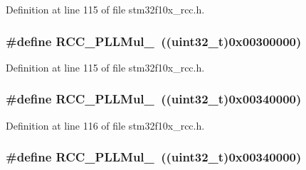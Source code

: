 Definition at line 115 of file stm32f10x\+\_\+rcc.\+h.

\subsubsection[{\texorpdfstring{R\+C\+C\+\_\+\+P\+L\+L\+Mul\+\_\+14}{RCC_PLLMul_14}}]{\setlength{\rightskip}{0pt plus 5cm}\#define R\+C\+C\+\_\+\+P\+L\+L\+Mul\+\_~(({\bf uint32\+\_\+t})0x00300000)}\hypertarget{group___p_l_l__multiplication__factor_ga457e11adfe1e815eeb5f38de61a94328}{}\label{group___p_l_l__multiplication__factor_ga457e11adfe1e815eeb5f38de61a94328}


Definition at line 115 of file stm32f10x\+\_\+rcc.\+h.

\subsubsection[{\texorpdfstring{R\+C\+C\+\_\+\+P\+L\+L\+Mul\+\_\+15}{RCC_PLLMul_15}}]{\setlength{\rightskip}{0pt plus 5cm}\#define R\+C\+C\+\_\+\+P\+L\+L\+Mul\+\_~(({\bf uint32\+\_\+t})0x00340000)}\hypertarget{group___p_l_l__multiplication__factor_gaad1fbc2e251391b4c469e39ccf05d642}{}\label{group___p_l_l__multiplication__factor_gaad1fbc2e251391b4c469e39ccf05d642}


Definition at line 116 of file stm32f10x\+\_\+rcc.\+h.

\subsubsection[{\texorpdfstring{R\+C\+C\+\_\+\+P\+L\+L\+Mul\+\_\+15}{RCC_PLLMul_15}}]{\setlength{\rightskip}{0pt plus 5cm}\#define R\+C\+C\+\_\+\+P\+L\+L\+Mul\+\_~(({\bf uint32\+\_\+t})0x00340000)}\hypertarget{group___p_l_l__multiplication__factor_gaad1fbc2e251391b4c469e39ccf05d642}{}\label{group___p_l_l__multiplication__factor_gaad1fbc2e251391b4c469e39ccf05d642}


